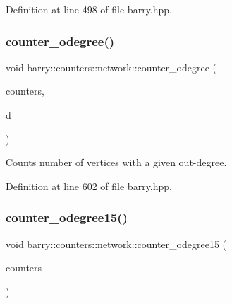 Definition at line 498 of file barry.\+hpp.

\mbox{\label{namespacebarry_1_1counters_1_1network_af679a51acdd35805c7c40748af65c0f4}} 
\subsubsection{\texorpdfstring{counter\+\_\+odegree()}{counter\_odegree()}}
{\footnotesize\ttfamily void barry\+::counters\+::network\+::counter\+\_\+odegree (\begin{DoxyParamCaption}\item[{\hyperlink{namespacebarry_1_1counters_1_1network_a3b3c590303d47840d1967372ae495d95}{Net\+Counter\+Vector} $\ast$}]{counters,  }\item[{std\+::vector$<$ \hyperlink{namespacebarry_a11dfc53ddb4672278319aa04f1e09a6c}{uint} $>$}]{d }\end{DoxyParamCaption})\hspace{0.3cm}{\ttfamily [inline]}}



Counts number of vertices with a given out-\/degree. 



Definition at line 602 of file barry.\+hpp.

\mbox{\label{namespacebarry_1_1counters_1_1network_a7a43854f3227f5f92d3ff580e99c7136}} 
\subsubsection{\texorpdfstring{counter\+\_\+odegree15()}{counter\_odegree15()}}
{\footnotesize\ttfamily void barry\+::counters\+::network\+::counter\+\_\+odegree15 (\begin{DoxyParamCaption}\item[{\hyperlink{namespacebarry_1_1counters_1_1network_a3b3c590303d47840d1967372ae495d95}{Net\+Counter\+Vector} $\ast$}]{counters }\end{DoxyParamCaption})\hspace{0.3cm}{\ttfamily [inline]}}



